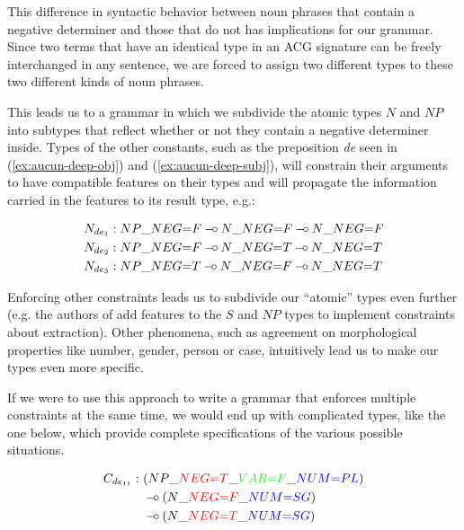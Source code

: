 \documentclass{llncs}
\def\limp {\mathbin{{-}\mkern-3.5mu{\circ}}}
\begin{document}
This difference in syntactic behavior between noun phrases that contain a
negative determiner and those that do not has implications for our
grammar. Since two terms that have an identical type in an ACG signature can
be freely interchanged in any sentence, we are forced to assign two different
types to these two different kinds of noun phrases.


This leads us to a grammar in which we subdivide the atomic types $N$
and $NP$ into subtypes that reflect whether or not they contain a
negative determiner inside. Types of the other constants, such as the
preposition \emph{de} seen in (\ref{ex:aucun-deep-obj}) and
(\ref{ex:aucun-deep-subj}), will constrain their arguments to have
compatible features on their types and will propagate the information
carried in the features to its result type, e.g.:

\begin{align*}
N_{de_1} &: NP\_NEG{=}F \limp N\_NEG{=}F \limp N\_NEG{=}F \\
N_{de_2} &: NP\_NEG{=}F \limp N\_NEG{=}T \limp N\_NEG{=}T \\
N_{de_3} &: NP\_NEG{=}T \limp N\_NEG{=}F \limp N\_NEG{=}T
\end{align*}

Enforcing other constraints leads us to subdivide our ``atomic'' types
even further (e.g. the authors of \cite{pogodalla2012controlling} add
features to the $S$ and $NP$ types to implement constraints about
extraction). Other phenomena, such as agreement on morphological
properties like number, gender, person or case, intuitively lead us to
make our types even more specific.

If we were to use this approach to write a grammar that enforces multiple
constraints at the same time, we would end up with complicated types, like the
one below, which provide complete specifications of the various possible
situations.

\begin{align*}
C_{de_{11}} :\ &(NP\_\textcolor{red}{NEG{=}T}\_\textcolor{green}{VAR{=}F}\_\textcolor{blue}{NUM{=}PL}) \\
&\limp (N\_\textcolor{red}{NEG{=}F}\_\textcolor{blue}{NUM{=}SG}) \\
&\limp (N\_\textcolor{red}{NEG{=}T}\_\textcolor{blue}{NUM{=}SG})
\end{align*}
\end{document}
